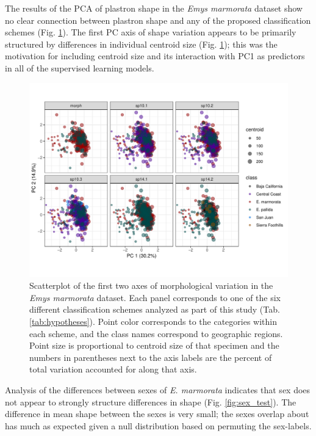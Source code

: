 \documentclass[12pt,letterpaper]{article}
\begin{document}
The results of the PCA of plastron shape in the \textit{Emys marmorata} dataset show no clear connection between plastron shape and any of the proposed classification schemes (Fig. \ref{fig:emys_pca}). The first PC axis of shape variation appears to be primarily structured by differences in individual centroid size (Fig. \ref{fig:emys_pca}); this was the motivation for including centroid size and its interaction with PC1 as predictors in all of the supervised learning models.

\begin{figure}[ht]
  \centering
  \includegraphics[height = \textheight, width = \textwidth, keepaspectratio = true]{figure/emys_pc_graph}
  \caption{Scatterplot of the first two axes of morphological variation in the \textit{Emys marmorata} dataset. Each panel corresponds to one of the six different classification schemes analyzed as part of this study (Tab. \ref{tab:hypotheses}). Point color corresponds to the categories within each scheme, and the class names correspond to geographic regions. Point size is proportional to centroid size of that specimen and the numbers in parentheses next to the axis labels are the percent of total variation accounted for along that axis.}
  \label{fig:emys_pca}
\end{figure}


Analysis of the differences between sexes of \textit{E. marmorata} indicates that sex does not appear to strongly structure differences in shape (Fig. \ref{fig:sex_test}). The difference in mean shape between the sexes is very small; the sexes overlap about has much as expected given a null distribution based on permuting the sex-labels.
\end{document}
